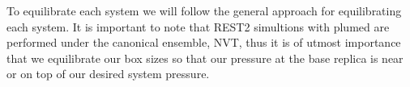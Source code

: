To equilibrate each system we will follow the general approach for equilibrating each system. 
It is important to note that REST2 simultions with plumed are performed under the canonical ensemble, NVT, thus it is of utmost importance that we equilibrate our box sizes so that our pressure at the base replica is near or on top of our desired system pressure. 